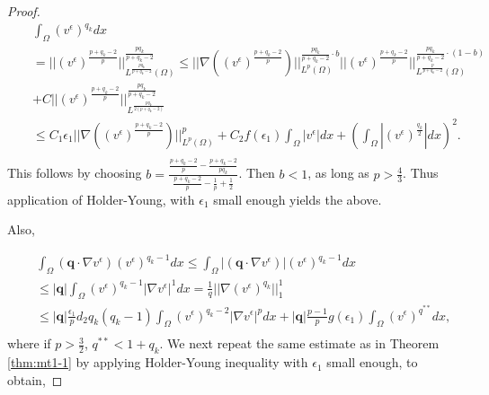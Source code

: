 \documentclass[10pt]{amsart}
\theoremstyle{plain}
\theoremstyle{definition}
\begin{document}
\begin{proof}
\begin{eqnarray}
&& \int_{\Omega} (v^{\epsilon})^{q_{k}}dx  \nonumber \\
&& = ||(v^{\epsilon})^{\frac{p + q_{k} - 2}{p}}||^{\frac{pq_{k}}{p + q_{k} - 2}}_{L^{\frac{pq_{k}}{p + q_{k} - 2}}(\Omega)} \leq ||\nabla ( (v^{\epsilon})^{\frac{p + q_{k} - 2}{p}})||^{\frac{pq_{k}}{p + q_{k} - 2} \cdot b}_{L^{p}(\Omega)}||(v^{\epsilon})^{\frac{p + q_{k} - 2}{p}}||^{\frac{pq_{k}}{p + q_{k} - 2} \cdot (1-b)}_{L^{\frac{p}{p + q_{k} - 2}}(\Omega)} \nonumber \\
&& + C||(v^{\epsilon})^{\frac{p + q_{k} - 2}{p}}||^{\frac{pq_{k}}{p + q_{k} - 2}}_{L^{\frac{pq_{k}}{2(p + q_{k} - 2)}}} \nonumber \\
&& \leq C_{1}\epsilon_{1} ||\nabla ( (v^{\epsilon})^{\frac{p + q_{k} - 2}{p}})||^{p}_{L^{p}(\Omega)} + C_{2}f(\epsilon_{1})\int_{\Omega}|v^{\epsilon}|dx + \left(\int_{\Omega}|(v^{\epsilon})^{\frac{q_{k}}{2}}|dx\right)^{2}. \nonumber \\
\end{eqnarray}
%
This follows by choosing 
$b=\frac{\frac{p+q_{k}-2}{p} - \frac{p+q_{k}-2}{pq_{k}}}{\frac{p+q_{k}-2}{p} - \frac{1}{p} + \frac{1}{2}}$. Then $b<1$, as long as $p>\frac{4}{3}$. Thus application of Holder-Young, with $\epsilon_{1}$ small enough yields the above.







Also,


\begin{eqnarray}
&&\int_{\Omega} (\textbf{q}\cdot \nabla v^{\epsilon}) (v^{\epsilon})^{q_{k}-1}dx \leq \int_{\Omega} |(\textbf{q}\cdot \nabla v^{\epsilon})| (v^{\epsilon})^{q_{k}-1}dx \nonumber \\
&& \leq 
|\textbf{q}|\int_{\Omega} (v^{\epsilon})^{q_{k}-1}|\nabla v^{\epsilon}|^{1}dx = \frac{1}{q}||\nabla (v^{\epsilon})^{q_{k}}||^{1}_{1}\nonumber \\
&& \leq |\textbf{q}|\frac{\epsilon_{1}}{p} d_{2} q_{k}(q_{k}-1)\int_{\Omega} (v^{\epsilon})^{q_{k}-2}|\nabla v^{\epsilon}|^{p}dx + |\textbf{q}|\frac{p-1}{p}g(\epsilon_{1})\int_{\Omega} (v^{\epsilon})^{q^{**}}dx ,\nonumber \\
\end{eqnarray}
%
where if $p > \frac{3}{2}$, $q^{**} < 1 + q_{k}$. We next repeat the same estimate as in Theorem \ref{thm:mt1-1} by applying Holder-Young inequality with $\epsilon_{1}$ small enough, to obtain,



\end{proof}
\end{document}
